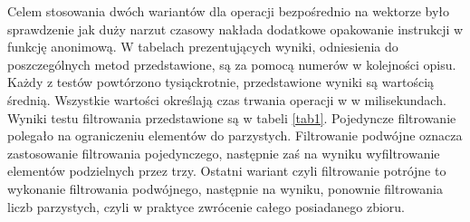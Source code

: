 \documentclass[a4paper,10pt]{report}
\begin{document}
Celem stosowania dwóch wariantów dla operacji bezpośrednio na wektorze było sprawdzenie jak duży narzut czasowy nakłada dodatkowe opakowanie instrukcji w funkcję anonimową.
W tabelach prezentujących wyniki, odniesienia do poszczególnych metod przedstawione, są za pomocą numerów w kolejności opisu.
Każdy z testów powtórzono tysiąckrotnie, przedstawione wyniki są wartością średnią. Wszystkie wartości określają czas trwania operacji w w milisekundach.
Wyniki testu filtrowania przedstawione są w tabeli \ref{tab1}. Pojedyncze filtrowanie polegało na ograniczeniu elementów do parzystych. Filtrowanie podwójne oznacza zastosowanie filtrowania pojedynczego, następnie zaś na wyniku wyfiltrowanie elementów podzielnych przez trzy. Ostatni wariant czyli filtrowanie potrójne to wykonanie filtrowania podwójnego, następnie na wyniku, ponownie filtrowania liczb parzystych, czyli w praktyce zwrócenie całego posiadanego zbioru.
\end{document}
